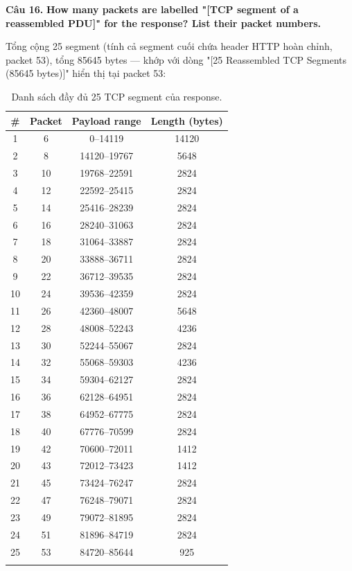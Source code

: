 \documentclass[12pt,a4paper]{article}
\newcommand{\question}[2]{\par\medskip\noindent\textbf{Câu #1.} \textbf{#2}\par\smallskip}
\newcommand{\answer}[1]{\par #1\par}
\begin{document}
\question{16}{How many packets are labelled "[TCP segment of a reassembled PDU]" for the response? List their packet numbers.}
\answer{Tổng cộng 25 segment (tính cả segment cuối chứa header HTTP hoàn chỉnh, packet 53), tổng 85645 bytes --- khớp với dòng "[25 Reassembled TCP Segments (85645 bytes)]" hiển thị tại packet 53:}

\begin{longtable}{@{}cccc@{}}
  \toprule
  \rowcolor{blue!10} \textbf{\#} & \textbf{Packet} & \textbf{Payload range} & \textbf{Length (bytes)} \\
  \midrule
  \endhead
  1  & 6  & 0--14119    & 14120 \\
  2  & 8  & 14120--19767 & 5648 \\
  3  & 10 & 19768--22591 & 2824 \\
  4  & 12 & 22592--25415 & 2824 \\
  5  & 14 & 25416--28239 & 2824 \\
  6  & 16 & 28240--31063 & 2824 \\
  7  & 18 & 31064--33887 & 2824 \\
  8  & 20 & 33888--36711 & 2824 \\
  9  & 22 & 36712--39535 & 2824 \\
  10 & 24 & 39536--42359 & 2824 \\
  11 & 26 & 42360--48007 & 5648 \\
  12 & 28 & 48008--52243 & 4236 \\
  13 & 30 & 52244--55067 & 2824 \\
  14 & 32 & 55068--59303 & 4236 \\
  15 & 34 & 59304--62127 & 2824 \\
  16 & 36 & 62128--64951 & 2824 \\
  17 & 38 & 64952--67775 & 2824 \\
  18 & 40 & 67776--70599 & 2824 \\
  19 & 42 & 70600--72011 & 1412 \\
  20 & 43 & 72012--73423 & 1412 \\
  21 & 45 & 73424--76247 & 2824 \\
  22 & 47 & 76248--79071 & 2824 \\
  23 & 49 & 79072--81895 & 2824 \\
  24 & 51 & 81896--84719 & 2824 \\
  25 & 53 & 84720--85644 & 925 \\
  \bottomrule
  \caption{Danh sách đầy đủ 25 TCP segment của response.}
\end{longtable}
\end{document}
